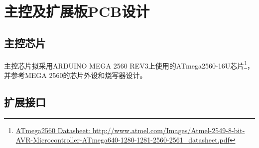 \chapter{主控及扩展板PCB设计}
\label{cha:PCB}

\section{主控芯片}

主控芯片拟采用ARDUINO MEGA 2560 REV3\cite{arduino_mega-2560-r3}上使用的ATmega2560-16U芯片\footnote{\href{http://www.atmel.com/Images/Atmel-2549-8-bit-AVR-Microcontroller-ATmega640-1280-1281-2560-2561_datasheet.pdf}{ATmega2560 Datasheet: http://www.atmel.com/Images/Atmel-2549-8-bit-AVR-Microcontroller-ATmega640-1280-1281-2560-2561_datasheet.pdf}}，并参考MEGA 2560的芯片外设和烧写器设计。




\section{扩展接口}